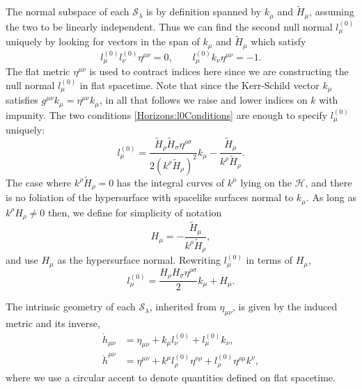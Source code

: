 The normal subspace of each $\mathcal{S}_{\lambda}$ is by definition spanned by $k_{\mu}$ and $\tilde{H}_{\mu}$,
assuming the two to be linearly independent. Thus we can find the second null normal $l^{(0)}_{\mu}$ uniquely by
looking for vectors in the span of $k_{\mu}$ and $\tilde{H}_{\mu}$ which satisfy
\begin{equation} \label{Horizons:l0Conditions} 
    l^{(0)}_{\mu} l^{(0)}_{\nu} \eta^{\mu \nu} = 0, \qquad l^{(0)}_{\mu} k_{\nu} \eta^{\mu \nu} = -1.
\end{equation}
The flat metric $\eta^{\mu \nu}$ is used to contract indices here since we are constructing the null normal
$l^{(0)}_{\mu}$ in flat spacetime. Note that since the Kerr-Schild vector $k_{\mu}$ satisfies $g^{\mu \nu} k_{\mu}
= \eta^{\mu \nu} k_{\mu}$, in all that follows we raise and lower indices on $k$ with impunity. The two conditions \eqref{Horizons:l0Conditions} are enough to specify $l^{(0)}_{\mu}$ uniquely:
\begin{equation}  
    l^{(0)}_{\mu} = \frac{\tilde{H}_{\rho} \tilde{H}_{\sigma} \eta^{\rho \sigma}}{2 (k^{\rho}
    \tilde{H}_{\rho})^{2}} k_{\mu} - \frac{\tilde{H}_{\mu}}{k^{\rho} \tilde{H}_{\rho}}.
\end{equation}
The case where $k^{\rho} \tilde{H}_{\rho} = 0$ has the integral curves of $k^{\mu}$ lying on the $\mathcal{H}$, and
there is no foliation of the hypersurface with spacelike surfaces normal to $k_{\mu}$. As long as $k^{\rho}
H_{\rho} \neq 0$ then, we define for simplicity of notation
\begin{equation} \label{Horizons:HNorm} 
    H_{\mu} = -\frac{\tilde{H}_{\mu}}{k^{\rho} \tilde{H}_{\rho}},
\end{equation}
and use $H_{\mu}$ as the hypersurface normal. Rewriting $l^{(0)}_{\mu}$ in terms of $H_{\mu}$,
\begin{equation} \label{Horizons:l0FromH} 
    l^{(0)}_{\mu} = \frac{H_{\rho}H_{\sigma}\eta^{\rho\sigma}}{2} k_{\mu} + H_{\mu}.
\end{equation}

The intrinsic geometry of each $\mathcal{S}_{\lambda}$, inherited from $\eta_{\mu \nu}$, is given by the induced metric and its inverse,
\begin{equation} \label{Horizons:flatInducedMetric} 
    \begin{split}
        \mathring{h}_{\mu \nu} &= \eta_{\mu \nu} + k_{\mu} l^{(0)}_{\nu} + l^{(0)}_{\mu} k_{\nu}, \\
        \mathring{h}^{\mu \nu} &= \eta^{\mu \nu} + k^{\mu} l^{(0)}_{\rho} \eta^{\nu \rho} + l^{(0)}_{\rho}
        \eta^{\rho \mu} k^{\nu},
    \end{split}
\end{equation}
where we use a circular accent to denote quantities defined on flat spacetime.

